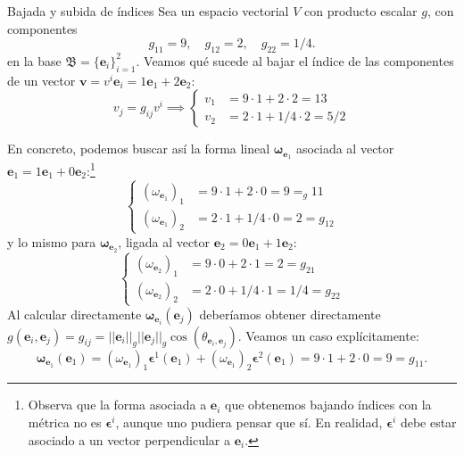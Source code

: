 \begin{example}
    {Bajada y subida de índices
    \label{ex.2bajarindice}}
    Sea un espacio vectorial \(V\) con producto escalar \(g\), con componentes 
    \begin{equation*}
        g_{11} = 9,\quad g_{12} = 2,\quad g_{22} = 1/4.
    \end{equation*}
    en la base \(\mathfrak{B}= \{\mathbf{e}_i\}_{i=1}^2\). Veamos qué sucede al bajar el índice de las componentes de un vector \(\mathbf{v} = v^i\mathbf{e}_i = 1\mathbf{e}_1 + 2\mathbf{e}_2\):
    \begin{equation}
        v_j = g_{ij}v^i \implies \left\{
            \begin{aligned}
                v_1 &= 9\cdot 1 + 2\cdot 2 = 13\\
                v_2 &= 2\cdot 1 + 1/4\cdot 2 = 5/2
            \end{aligned}
        \right.
    \end{equation}
    
    En concreto, podemos buscar así la forma lineal \(\boldsymbol{\omega}_{\mathbf{e}_1}\) asociada al vector \(\mathbf{e}_1 = 1\mathbf{e}_1 + 0\mathbf{e}_2\):\footnote{Observa que la forma asociada a \(\mathbf{e}_i\) que obtenemos bajando índices con la métrica no es \(\boldsymbol{\epsilon}^i\), aunque uno pudiera pensar que sí. En realidad, \(\boldsymbol{\epsilon}^i\) debe estar asociado a un vector perpendicular a \(\mathbf{e}_i\).}
    \begin{equation}
        \left\{
            \begin{aligned}
                (\omega_{\mathbf{e}_1})_1 &= 9\cdot 1 + 2\cdot 0 = 9 = _g{11}\\
                (\omega_{\mathbf{e}_1})_2 &= 2\cdot 1 + 1/4\cdot 0 = 2 = g_{12}
            \end{aligned}
        \right.
    \end{equation}
    y lo mismo para \(\boldsymbol{\omega}_{\mathbf{e}_2}\), ligada al vector \(\mathbf{e}_2 = 0\mathbf{e}_1 + 1\mathbf{e}_2\):
    \begin{equation}
        \left\{
            \begin{aligned}
                (\omega_{\mathbf{e}_2})_1 &= 9\cdot 0 + 2\cdot 1 = 2 = g_{21}\\
                (\omega_{\mathbf{e}_2})_2 &= 2\cdot 0 + 1/4\cdot 1 = 1/4 = g_{22}
            \end{aligned}
        \right.
    \end{equation}
    Al calcular directamente \(\boldsymbol{\omega}_{\mathbf{e}_i}(\mathbf{e}_j)\) deberíamos obtener directamente \(g(\mathbf{e}_i,\mathbf{e}_j) = g_{ij} = ||\mathbf{e}_i||_g||\mathbf{e}_j||_g \cos(\theta_{\mathbf{e}_i,\mathbf{e}_j})\). Veamos un caso explícitamente:
    \begin{equation}
        \boldsymbol{\omega}_{\mathbf{e}_1}(\mathbf{e}_1) = (\omega_{\mathbf{e}_1})_1 \boldsymbol{\epsilon}^1(\mathbf{e}_1) + (\omega_{\mathbf{e}_1})_2 \boldsymbol{\epsilon}^2(\mathbf{e}_1) = 9\cdot1+2\cdot0 = 9 = g_{11}.
    \end{equation}


\end{example}
